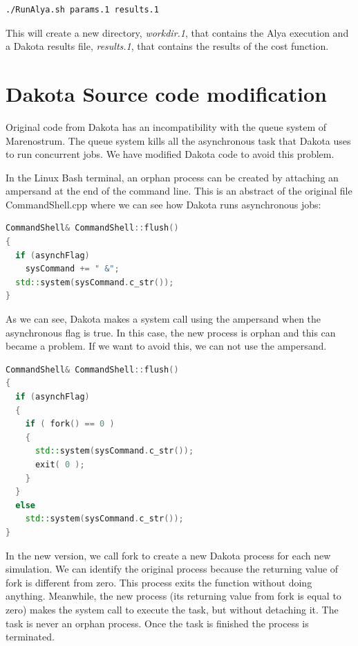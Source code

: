 \documentclass[12pt,a4paper,article]{memoir}
\begin{document}
\begin{lstlisting}[style=MyCodeStyle,language=bash]
 ./RunAlya.sh params.1 results.1
\end{lstlisting}

This will create a new directory, \textit{workdir.1}, that contains the Alya execution and a Dakota results file, \textit{results.1}, that contains the results of the cost function.

\appendix

\chapter{Dakota Source code modification}
\label{chapter:CodeMod}

Original code from Dakota has an incompatibility with the queue system of Marenostrum. The queue system kills all the asynchronous task that Dakota uses to run concurrent jobs. We have modified Dakota code to avoid this problem.

In the Linux Bash terminal, an orphan process can be created by attaching an ampersand at the end of the command line. This is an abstract of the original file CommandShell.cpp where we can see how Dakota runs asynchronous jobs:

\begin{lstlisting}[style=MyCodeStyle,language=C++]
CommandShell& CommandShell::flush()
{
  if (asynchFlag)
    sysCommand += " &";
  std::system(sysCommand.c_str());
}
\end{lstlisting}

As we can see, Dakota makes a system call using the ampersand when the asynchronous flag is true. In this case, the new process is orphan and this can became a problem. If we want to avoid this, we can not use the ampersand.

\begin{lstlisting}[style=MyCodeStyle,language=C++]
CommandShell& CommandShell::flush()
{
  if (asynchFlag)
  {
    if ( fork() == 0 )
    {
      std::system(sysCommand.c_str());
      exit( 0 );
    }
  }
  else
    std::system(sysCommand.c_str());
}
\end{lstlisting}

In the new version, we call fork to create a new Dakota process for each new simulation. We can identify the original process because the returning value of fork is different from zero. This process exits the function without doing anything. Meanwhile, the new process (its returning value from fork is equal to zero) makes the system call to execute the task, but without detaching it. The task is never an orphan process. Once the task is finished the process is terminated.
\end{document}
